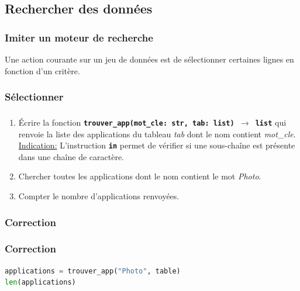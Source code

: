 \documentclass[svgnames,11pt]{beamer}
\begin{document}
\subsection{Rechercher des données}
\begin{frame}
    \frametitle{Imiter un moteur de recherche}

    Une action courante sur un jeu de données est de sélectionner certaines lignes en fonction d'un critère.

\end{frame}

\subsubsection{Sélectionner}
\begin{frame}
    \frametitle{}

    \begin{activite}
        \begin{enumerate}
            \item Écrire la fonction \textbf{\texttt{trouver\_app(mot\_cle: str, tab: list) $\rightarrow$ list}} qui renvoie la liste des applications du tableau \emph{tab} dont le nom contient \emph{mot\_cle}.\\
                  \underline{Indication:} L'instruction \textbf{\texttt{in}} permet de vérifier si une sous-chaîne est présente dans une chaîne de caractère.
            \item Chercher toutes les applications dont le nom contient le mot \emph{Photo}.
            \item Compter le nombre d'applications renvoyées.
        \end{enumerate}
    \end{activite}

\end{frame}
\begin{frame}
    \frametitle{Correction}

    

\end{frame}
\begin{frame}[fragile]
    \frametitle{Correction}

    \begin{center}
        \begin{lstlisting}[language=Python, basicstyle=\small]
applications = trouver_app("Photo", table)
len(applications)
\end{lstlisting}
    \end{center}
\end{frame}
\end{document}
